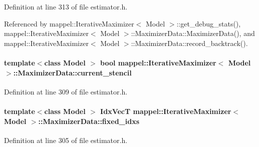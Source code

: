 Definition at line 313 of file estimator.\+h.



Referenced by mappel\+::\+Iterative\+Maximizer$<$ Model $>$\+::get\+\_\+debug\+\_\+stats(), mappel\+::\+Iterative\+Maximizer$<$ Model $>$\+::\+Maximizer\+Data\+::\+Maximizer\+Data(), and mappel\+::\+Iterative\+Maximizer$<$ Model $>$\+::\+Maximizer\+Data\+::record\+\_\+backtrack().

\paragraph[{\texorpdfstring{current\+\_\+stencil}{current_stencil}}]{\setlength{\rightskip}{0pt plus 5cm}template$<$class Model $>$ bool {\bf mappel\+::\+Iterative\+Maximizer}$<$ Model $>$\+::Maximizer\+Data\+::current\+\_\+stencil\hspace{0.3cm}{\ttfamily [protected]}}\hypertarget{classmappel_1_1IterativeMaximizer_1_1MaximizerData_a321e112eacabe76c882ea8976efb0e9b}{}\label{classmappel_1_1IterativeMaximizer_1_1MaximizerData_a321e112eacabe76c882ea8976efb0e9b}


Definition at line 309 of file estimator.\+h.

\paragraph[{\texorpdfstring{fixed\+\_\+idxs}{fixed_idxs}}]{\setlength{\rightskip}{0pt plus 5cm}template$<$class Model $>$ {\bf Idx\+VecT} {\bf mappel\+::\+Iterative\+Maximizer}$<$ Model $>$\+::Maximizer\+Data\+::fixed\+\_\+idxs}\hypertarget{classmappel_1_1IterativeMaximizer_1_1MaximizerData_aad1b023a8f0902b41d2454d4a3a16e89}{}\label{classmappel_1_1IterativeMaximizer_1_1MaximizerData_aad1b023a8f0902b41d2454d4a3a16e89}


Definition at line 305 of file estimator.\+h.



